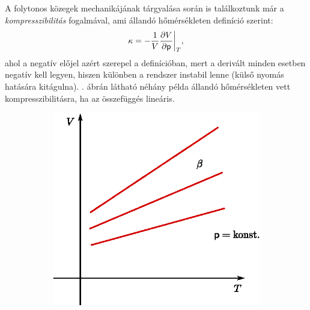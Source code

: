A folytonos közegek mechanikájának tárgyalása során is találkoztunk már a \emph{kompresszibilitás} fogalmával, ami állandó hőmérsékleten definíció szerint:
\begin{align}
    \kappa = -\frac{1}{V} \frac{\partial{V}}{\partial{\mathsf p}}\bigg|_T,
\end{align}
ahol a negatív előjel azért szerepel a definícióban, mert a derivált minden esetben negatív kell legyen, hiszen különben a rendszer instabil lenne (külső nyomás hatására kitágulna). . ábrán látható néhány példa állandó hőmérsékleten vett kompresszibilitásra, ha az összefüggés lineáris. 
\begin{figure}[!h]
    \centering
    \begin{subfigure}[b]{0.48\textwidth}
            \centering
            \includegraphics[width=\textwidth]{termo_2/termo_2_3}
            \label{fig:termo_2_3}
    \end{subfigure}\hfill
    \begin{subfigure}[b]{0.45\textwidth}
            \centering

\end{subfigure}
\end{figure}
